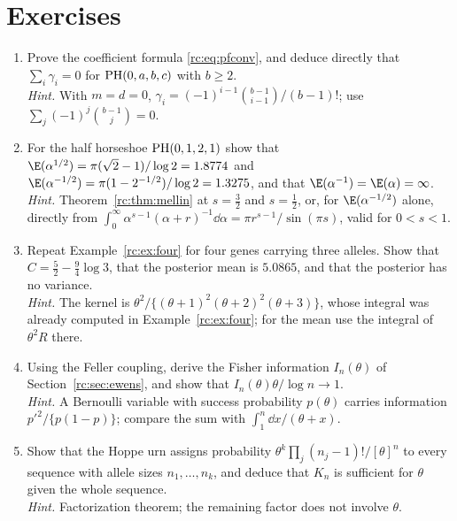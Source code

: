 \section{Exercises}\label{rc:sec:exercises}

\begin{enumerate}[label=\arabic*.,leftmargin=*,itemsep=4pt]
\item Prove the coefficient formula \eqref{rc:eq:pfconv}, and deduce directly that $\sum_i\gamma_i=0$ for $\mathrm{PH}(0,a,b,c)$ with $b\ge2$.\\
\emph{Hint.} With $m=d=0$, $\gamma_i=(-1)^{i-1}\binom{b-1}{i-1}/(b-1)!$; use $\sum_j(-1)^j\binom{b-1}{j}=0$.

\item For the half horseshoe $\mathrm{PH}(0,1,2,1)$ show that $\E(\alpha^{1/2})=\pi(\sqrt2-1)/\log2=1.8774$ and $\E(\alpha^{-1/2})=\pi(1-2^{-1/2})/\log2=1.3275$, and that $\E(\alpha^{-1})=\E(\alpha)=\infty$.\\
\emph{Hint.} Theorem~\ref{rc:thm:mellin} at $s=\frac32$ and $s=\frac12$, or, for $\E(\alpha^{-1/2})$ alone, directly from $\int_0^\infty\alpha^{s-1}(\alpha+r)^{-1}\dd\alpha=\pi r^{s-1}/\sin(\pi s)$, valid for $0<s<1$.

\item Repeat Example~\ref{rc:ex:four} for four genes carrying three alleles. Show that $C=\frac52-\frac94\log3$, that the posterior mean is $5.0865$, and that the posterior has no variance.\\
\emph{Hint.} The kernel is $\theta^2/\{(\theta+1)^2(\theta+2)^2(\theta+3)\}$, whose integral was already computed in Example~\ref{rc:ex:four}; for the mean use the integral of $\theta^2R$ there.

\item Using the Feller coupling, derive the Fisher information $I_n(\theta)$ of Section~\ref{rc:sec:ewens}, and show that $I_n(\theta)\theta/\log n\to1$.\\
\emph{Hint.} A Bernoulli variable with success probability $p(\theta)$ carries information $p'^2/\{p(1-p)\}$; compare the sum with $\int_1^n\dd x/(\theta+x)$.

\item Show that the Hoppe urn assigns probability $\theta^k\prod_j(n_j-1)!/[\theta]^n$ to every sequence with allele sizes $n_1,\dots,n_k$, and deduce that $K_n$ is sufficient for $\theta$ given the whole sequence.\\
\emph{Hint.} Factorization theorem; the remaining factor does not involve $\theta$.


\end{enumerate}
